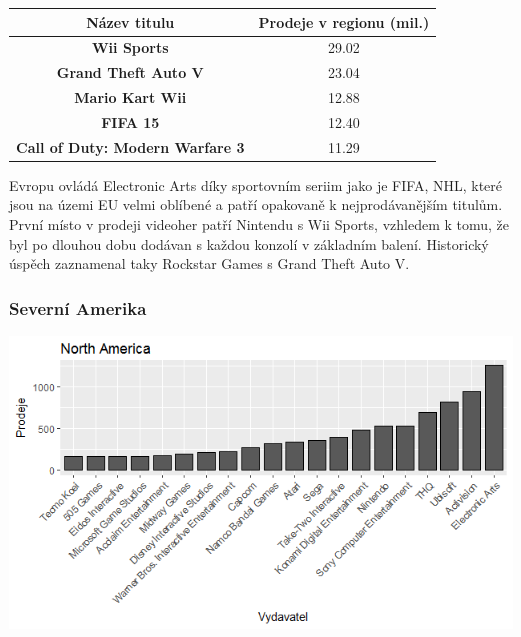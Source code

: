 \documentclass[a4paper,11pt]{article}
\begin{document}
\begin{center}
\begin{tabular}{|c|c|}
\hline
\textbf{Název titulu}                   & \textbf{Prodeje v regionu (mil.)} \\ \hline
\textbf{Wii Sports}                     & 29.02                             \\ \hline
\textbf{Grand Theft Auto V}             & 23.04                             \\ \hline
\textbf{Mario Kart Wii}                 & 12.88                             \\ \hline
\textbf{FIFA 15}                        & 12.40                             \\ \hline
\textbf{Call of Duty: Modern Warfare 3} & 11.29                             \\ \hline
\end{tabular}
\end{center}

Evropu ovládá Electronic Arts díky sportovním seriim jako je FIFA, NHL, které jsou na územi EU velmi oblíbené a patří opakovaně k nejprodávanějším titulům. První místo v prodeji videoher patří Nintendu s Wii Sports, vzhledem k tomu, že byl po dlouhou dobu dodávan s každou konzolí v základním balení. Historický úspěch zaznamenal taky Rockstar Games s Grand Theft Auto V.


\newpage

\subsubsection{Severní Amerika}
\includegraphics[scale=0.8]{Rplot11}
\end{document}
